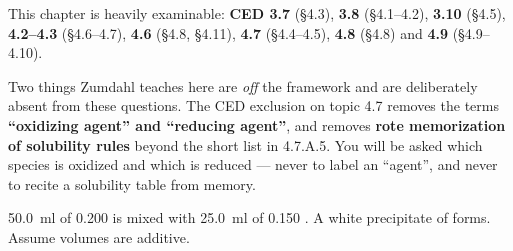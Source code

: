 \documentclass{apchem-exam}
\begin{document}
\apctitleblock

\begin{apcnote}
This chapter is heavily examinable: \textbf{CED 3.7} (\S4.3),
\textbf{3.8} (\S4.1--4.2), \textbf{3.10} (\S4.5), \textbf{4.2--4.3}
(\S4.6--4.7), \textbf{4.6} (\S4.8, \S4.11), \textbf{4.7} (\S4.4--4.5),
\textbf{4.8} (\S4.8) and \textbf{4.9} (\S4.9--4.10).

Two things Zumdahl teaches here are \emph{off} the framework and are
deliberately absent from these questions. The CED exclusion on topic 4.7
removes the terms \textbf{``oxidizing agent'' and ``reducing agent''}, and
removes \textbf{rote memorization of solubility rules} beyond the short
list in 4.7.A.5. You will be asked which species is oxidized and which is
reduced --- never to label an ``agent'', and never to recite a solubility
table from memory.
\end{apcnote}



\SI{50.0}{\milli\litre} of \SI{0.200}{\Molar}  is mixed with
\SI{25.0}{\milli\litre} of \SI{0.150}{\Molar} . A white
precipitate of  forms. Assume volumes are additive.
\end{document}
